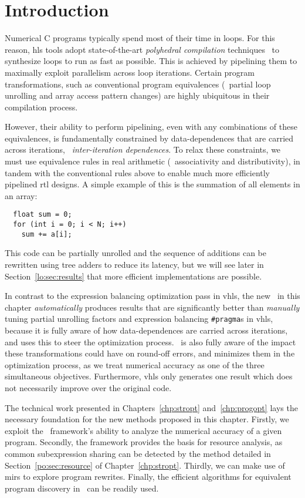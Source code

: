 \section{Introduction}
\label{lo:sec:introduction}

Numerical C programs typically spend most of their time in loops.  For this
reason, \gls{hls} tools adopt state-of-the-art \emph{polyhedral compilation}
techniques~\cite{canis14} to synthesize loops to run as fast as possible.  This
is achieved by pipelining them to maximally exploit parallelism across loop
iterations.  Certain program transformations, such as conventional program
equivalences (\eg~partial loop unrolling and array access pattern changes) are
highly ubiquitous in their compilation process.

However, their ability to perform pipelining, even with any combinations of
these equivalences, is fundamentally constrained by data-dependences that
are carried across iterations, \ie~\emph{inter-iteration dependences}.  To
relax these constraints, we must use equivalence rules in real arithmetic
(\eg~associativity and distributivity), in tandem with the conventional rules
above to enable much more efficiently pipelined \gls{rtl} designs.  A simple
example of this is the summation of all elements in an array:
\begin{lstlisting}
  float sum = 0;
  for (int i = 0; i < N; i++)
    sum += a[i];
\end{lstlisting}
This code can be partially unrolled and the sequence of additions can be
rewritten using tree adders to reduce its latency, but we will see later in
Section~\ref{lo:sec:results} that more efficient implementations are possible.

In contrast to the expression balancing optimization pass in \gls{vhls}, the
new \soap~in this chapter \emph{automatically} produces results that are
significantly better than \emph{manually} tuning partial unrolling factors
and expression balancing \verb|#pragma|s in \gls{vhls}, because it is fully
aware of how data-dependences are carried across iterations, and uses this
to steer the optimization process. \soap~is also fully aware of the impact
these transformations could have on round-off errors, and minimizes them in
the optimization process, as we treat numerical accuracy as one of the three
simultaneous objectives.  Furthermore, \gls{vhls} only generates one result
which does not necessarily improve over the original code.

The technical work presented in Chapters~\ref{chp:stropt} and~\ref{chp:progopt}
lays the necessary foundation for the new methods proposed in this chapter.
Firstly, we exploit the \soap~framework's ability to analyze the numerical
accuracy of a given program.  Secondly, the framework provides the basis for
resource analysis, as common subexpression sharing can be detected by the
method detailed in Section~\ref{po:sec:resource} of Chapter~\ref{chp:stropt}.
Thirdly, we can make use of \glspl{mir} to explore program rewrites.  Finally,
the efficient algorithms for equivalent program discovery in \soap~can be
readily used.


